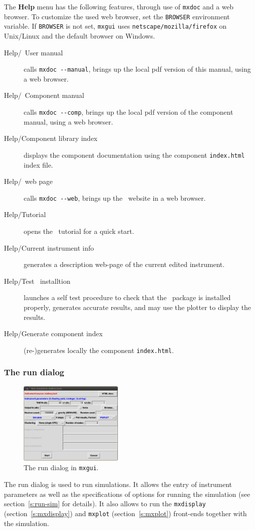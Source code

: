 \noindent The {\bf Help} menu has the following features, through use of
\verb+mxdoc+ and a web browser. To customize the used web browser, set
the \verb+BROWSER+ environment variable. If \verb+BROWSER+ is not set,
\verb+mxgui+ uses \verb+netscape/mozilla/firefox+ on Unix/Linux and the default browser on
Windows.
\begin{description}
\item[Help/\MCX\ User manual] calls \verb+mxdoc --manual+, brings up the local
  pdf version of this manual, using a web browser.
\item[Help/\MCX\ Component manual] calls \verb+mxdoc --comp+, brings up the local
  pdf version of the component manual, using a web browser.
\item[Help/Component library index] displays the component documentation using
  the component \verb+index.html+ index file.
\item[Help/\MCX\ web page] calls \verb+mxdoc --web+, brings up the \MCX\
  website in a web browser.
\item[Help/Tutorial] opens the \MCX\ tutorial for a quick start.
\item[Help/Current instrument info] generates a description web-page of the current edited instrument.
\item[Help/Test \MCX\ installtion] launches a self test procedure to check that the \MCX\ package is installed properly, generates accurate results, and may use the plotter to display the results.
\item[Help/Generate component index] (re-)generates locally the component \verb+index.html+.
\end{description}


\subsubsection{The run dialog}

\begin{figure}[htb!]
  \begin{center}
    \includegraphics[width=0.45\textwidth]{figures/mxgui-run.eps}
  \end{center}
\caption{The run dialog in \texttt{mxgui}.}
\label{fig:mxgui-run}
\end{figure}
%
The run dialog is used to run simulations. It allows the entry of
instrument parameters as well as the specifications of options for
running the simulation (see section~\ref{s:run-sim} for details). It
also allows to run the \verb+mxdisplay+ (section~\ref{s:mxdisplay}) and
\verb+mxplot+ (section~\ref{s:mxplot}) front-ends together with the
simulation.\index{Tools!mxplot}

